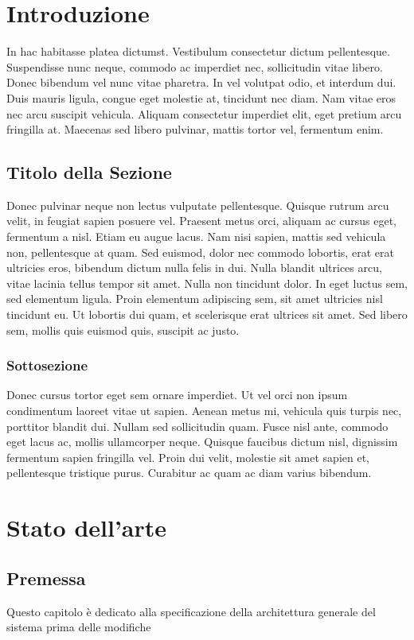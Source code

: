 \documentclass[target=bach,aauheader=,style=]{thud}
\begin{document}
\chapter{Introduzione}
In hac habitasse platea dictumst. Vestibulum consectetur dictum pellentesque. Suspendisse nunc neque, commodo ac imperdiet nec, sollicitudin vitae libero. Donec bibendum vel nunc vitae pharetra. In vel volutpat odio, et interdum dui. Duis mauris ligula, congue eget molestie at, tincidunt nec diam. Nam vitae eros nec arcu suscipit vehicula. Aliquam consectetur imperdiet elit, eget pretium arcu fringilla at. Maecenas \cite{Knu86} sed libero pulvinar, mattis tortor vel, fermentum enim.

\section{Titolo della Sezione}
Donec pulvinar neque non lectus vulputate pellentesque. Quisque rutrum arcu velit, in feugiat sapien posuere vel. Praesent metus orci, aliquam ac cursus eget, fermentum a nisl. Etiam eu augue lacus. Nam nisi sapien, mattis sed vehicula non, pellentesque at quam. Sed euismod, dolor nec commodo lobortis, erat erat ultricies eros, bibendum dictum nulla felis in dui. Nulla blandit ultrices arcu, vitae lacinia tellus tempor sit amet. Nulla non tincidunt dolor. In eget luctus sem, sed elementum ligula. Proin elementum adipiscing sem, sit amet ultricies nisl tincidunt eu. Ut lobortis dui quam, et scelerisque erat ultrices sit amet. Sed libero sem, mollis quis euismod quis, suscipit ac justo.

\subsection{Sottosezione}
Donec cursus tortor eget sem ornare imperdiet. Ut vel orci non ipsum condimentum laoreet vitae ut sapien. Aenean metus mi, vehicula quis turpis nec, porttitor blandit dui. Nullam sed sollicitudin quam. Fusce nisl ante, commodo eget lacus ac, mollis ullamcorper neque. Quisque faucibus dictum nisl, dignissim fermentum sapien fringilla vel. Proin dui velit, molestie sit amet sapien et, pellentesque tristique purus. Curabitur ac quam ac diam varius bibendum.


\chapter{Stato dell'arte}
\label{art}
\section{Premessa}
Questo capitolo è dedicato alla specificazione della architettura generale del sistema prima delle modifiche 
\end{document}
